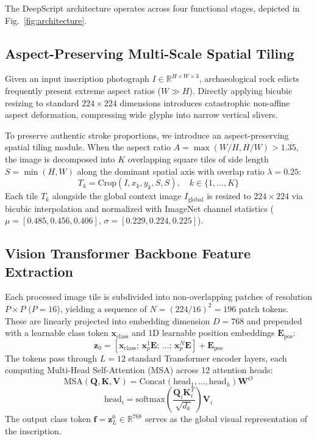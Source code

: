 \documentclass[conference,10pt]{IEEEtran}
\begin{document}
The DeepScript architecture operates across four functional stages, depicted in Fig.~\ref{fig:architecture}.

\subsection{Aspect-Preserving Multi-Scale Spatial Tiling}
Given an input inscription photograph $I \in \mathbb{R}^{H \times W \times 3}$, archaeological rock edicts frequently present extreme aspect ratios ($W \gg H$). Directly applying bicubic resizing to standard $224 \times 224$ dimensions introduces catastrophic non-affine aspect deformation, compressing wide glyphs into narrow vertical slivers.

To preserve authentic stroke proportions, we introduce an aspect-preserving spatial tiling module. When the aspect ratio $A = \max(W/H, H/W) > 1.35$, the image is decomposed into $K$ overlapping square tiles of side length $S = \min(H, W)$ along the dominant spatial axis with overlap ratio $\lambda = 0.25$:
\begin{equation}
T_k = \text{Crop}\left(I, x_k, y_k, S, S\right), \quad k \in \{1, \dots, K\}
\end{equation}
Each tile $T_k$ alongside the global context image $I_{\text{global}}$ is resized to $224 \times 224$ via bicubic interpolation and normalized with ImageNet channel statistics ($\mu = [0.485, 0.456, 0.406]$, $\sigma = [0.229, 0.224, 0.225]$).

\subsection{Vision Transformer Backbone Feature Extraction}
Each processed image tile is subdivided into non-overlapping patches of resolution $P \times P$ ($P = 16$), yielding a sequence of $N = (224/16)^2 = 196$ patch tokens. These are linearly projected into embedding dimension $D = 768$ and prepended with a learnable class token $\mathbf{x}_{\text{class}}$ and 1D learnable position embeddings $\mathbf{E}_{\text{pos}}$:
\begin{equation}
\mathbf{z}_0 = \left[ \mathbf{x}_{\text{class}}; \, \mathbf{x}_p^1 \mathbf{E}; \, \dots; \, \mathbf{x}_p^N \mathbf{E} \right] + \mathbf{E}_{\text{pos}}
\end{equation}
The tokens pass through $L = 12$ standard Transformer encoder layers, each computing Multi-Head Self-Attention (MSA) across 12 attention heads:
\begin{equation}
\text{MSA}(\mathbf{Q}, \mathbf{K}, \mathbf{V}) = \text{Concat}(\text{head}_1, \dots, \text{head}_h) \mathbf{W}^O
\end{equation}
\begin{equation}
\text{head}_i = \text{softmax}\left(\frac{\mathbf{Q}_i \mathbf{K}_i^T}{\sqrt{d_k}}\right) \mathbf{V}_i
\end{equation}
The output class token $\mathbf{f} = \mathbf{z}_L^0 \in \mathbb{R}^{768}$ serves as the global visual representation of the inscription.
\end{document}
